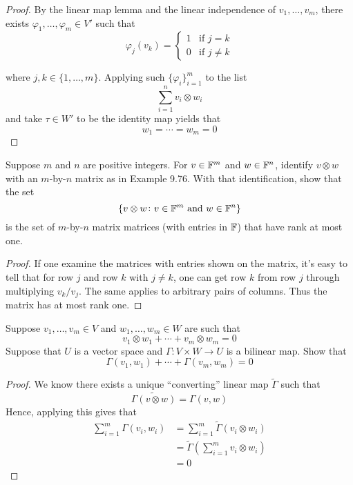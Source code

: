 \documentclass{extarticle}
\begin{document}
\begin{proof}
By the linear map lemma and the linear independence of \(v_1, \ldots, v_m\), there exists 
\(\varphi_1, \ldots, \varphi_m \in V'\) such that 
\[ \varphi_j(v_k) = \begin{cases}
    1 &\text{if } j = k \\ 
    0 &\text{if } j \neq k 
\end{cases}\]

where \(j, k \in \{1, \ldots, m\}\). Applying such \(\{\varphi_i\}_{i=1}^m\) to the list 
\[ \sum_{i=1}^{n} v_i \otimes w_i\]
and take \(\tau \in W'\) to be the identity map yields that 
\[w_1 = \cdots = w_m =  0\] 
\end{proof}

\begin{problem}{5}
    Suppose \(m\) and \(n\) are positive integers. For \(v \in \mathbb{F}^m\) and \(w \in \mathbb{F}^n\), 
    identify \(v \otimes w\) with an \(m\)-by-\(n\) matrix as in Example 9.76. With that identification, 
    show that the set 
    \[\{v \otimes w \colon v \in \mathbb{F}^m \text{ and } w \in \mathbb{F}^n\}\]
    is the set of \(m\)-by-\(n\) matrix matrices (with entries in \(\mathbb{F}\)) that have rank at most one. 
\end{problem}

\begin{proof}
If one examine the matrices with entries shown on the matrix, it's easy to tell that 
for row \(j\) and row \(k\) with \(j \neq k\), one can get row \(k\) from row \(j\) 
through multiplying \(v_k / v_j\). The same applies to arbitrary pairs of columns. Thus 
the matrix has at most rank one. 
\end{proof}

\begin{problem}{8}
    Suppose \(v_1, \ldots, v_m \in V\) and \(w_1, \ldots, w_m \in W\) are such that 
    \[ v_1 \otimes w_1 + \cdots + v_m \otimes w_m = 0\]
    Suppose that \(U\) is a vector space and \(\Gamma \colon V \times W \to U\) is a bilinear 
    map. Show that 
    \[ \Gamma(v_1, w_1) + \cdots + \Gamma(v_m, w_m) = 0\]
\end{problem}

\begin{proof}
We know there exists a unique ``converting'' linear map \(\tilde{\Gamma}\) such that 
\[\tilde{\Gamma(v \otimes w)} = \Gamma(v, w)\]
Hence, applying this gives that 
\begin{align*}
    \sum_{i=1}^{m} \Gamma (v_i, w_i) 
    &= \sum_{i=1}^{m} \tilde{\Gamma}(v_i \otimes w_i) \\ 
    &= \tilde{\Gamma} \left( \sum_{i=1}^{m} v_i \otimes w_i \right) \\ 
    &= 0 
\end{align*}
\end{proof}
\end{document}
